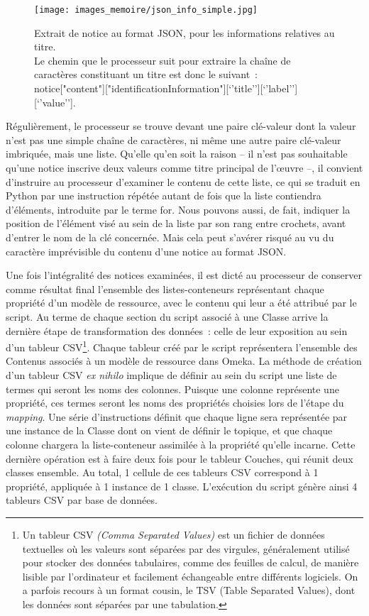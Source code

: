 \documentclass[a4paper,12pt, twoside]{book}
\begin{document}
\begin{figure}[!h]
    \centering
    \texttt{[image: images\_memoire/json\_info\_simple.jpg]}
    \caption*{Extrait de notice au format JSON, pour les informations relatives au titre.\\
    Le chemin que le processeur suit pour extraire la chaîne de caractères constituant un titre est donc le suivant~:\\ \textsf{notice["content"]["identificationInformation"][‘’title’’][‘’label’’][‘’value’’]}.}
    \label{Extrait de code JSON}
\end{figure}

Régulièrement, le processeur se trouve devant une paire clé-valeur dont la valeur n’est pas une simple chaîne de caractères, ni même une autre paire clé-valeur imbriquée, mais une liste. Qu’elle qu’en soit la raison – il n’est pas souhaitable qu’une notice inscrive deux valeurs comme titre principal de l’œuvre –, il convient d’instruire au processeur d’examiner le contenu de cette liste, ce qui se traduit en Python par une instruction répétée autant de fois que la liste contiendra d’éléments, introduite par le terme \textsf{for}. Nous pouvons aussi, de fait, indiquer la position de l’élément visé au sein de la liste par son rang entre crochets, avant d’entrer le nom de la clé concernée. Mais cela peut s’avérer risqué au vu du caractère imprévisible du contenu d’une notice au format JSON.

Une fois l’intégralité des notices examinées, il est dicté au processeur de conserver comme résultat final l’ensemble des listes-conteneurs représentant chaque propriété d’un modèle de ressource, avec le contenu qui leur a été attribué par le script. Au terme de chaque section du script associé à une Classe arrive la dernière étape de transformation des données~: celle de leur exposition au sein d’un tableur CSV\footnote{Un tableur CSV \emph{(Comma Separated Values)} est un fichier de données textuelles où les valeurs sont séparées par des virgules, généralement utilisé pour stocker des données tabulaires, comme des feuilles de calcul, de manière lisible par l'ordinateur et facilement échangeable entre différents logiciels. On a parfois recours à un format cousin, le TSV (Table Separated Values), dont les données sont séparées par une tabulation.}. Chaque tableur créé par le script représentera l’ensemble des Contenus associés à un modèle de ressource dans Omeka. La méthode de création d’un tableur CSV \textit{ex nihilo} implique de définir au sein du script une liste de termes qui seront les noms des colonnes. Puisque une colonne représente une propriété, ces termes seront les noms des propriétés choisies lors de l’étape du \textit{mapping}. Une série d’instructions définit que chaque ligne sera représentée par une instance de la Classe dont on vient de définir le topique, et que chaque colonne chargera la liste-conteneur assimilée à la propriété qu’elle incarne. Cette dernière opération est à faire deux fois pour le tableur Couches, qui réunit deux classes ensemble. Au total, 1 cellule de ces tableurs CSV correspond à 1 propriété, appliquée à 1 instance de 1 classe. L’exécution du script génère ainsi 4 tableurs CSV par base de données.
\end{document}
